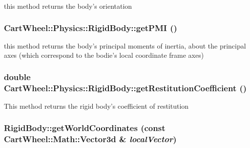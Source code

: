 \label{classCartWheel_1_1Physics_1_1RigidBody_ad2e28d46c26b424c287b39939f9ff3c1}
this method returns the body's orientation \hypertarget{classCartWheel_1_1Physics_1_1RigidBody_a2f0775cdd342fce39edf36185ef67b2d}{
\subsubsection[{getPMI}]{ CartWheel::Physics::RigidBody::getPMI ()}}
\label{classCartWheel_1_1Physics_1_1RigidBody_a2f0775cdd342fce39edf36185ef67b2d}
this method returns the body's principal moments of inertia, about the principal axes (which correspond to the bodie's local coordinate frame axes) \hypertarget{classCartWheel_1_1Physics_1_1RigidBody_a8d7b517c70e7b06295d0b683148f37de}{
\subsubsection[{getRestitutionCoefficient}]{\setlength{\rightskip}{0pt plus 5cm}double CartWheel::Physics::RigidBody::getRestitutionCoefficient ()}}
\label{classCartWheel_1_1Physics_1_1RigidBody_a8d7b517c70e7b06295d0b683148f37de}
This method returns the rigid body's coefficient of restitution \hypertarget{classCartWheel_1_1Physics_1_1RigidBody_ac333a6a3cf33bedfb73b37b6590a732e}{
\subsubsection[{getWorldCoordinates}]{ RigidBody::getWorldCoordinates (const {\bf CartWheel::Math::Vector3d} \& {\em localVector})}}
\label{classCartWheel_1_1Physics_1_1RigidBody_ac333a6a3cf33bedfb73b37b6590a732e}
